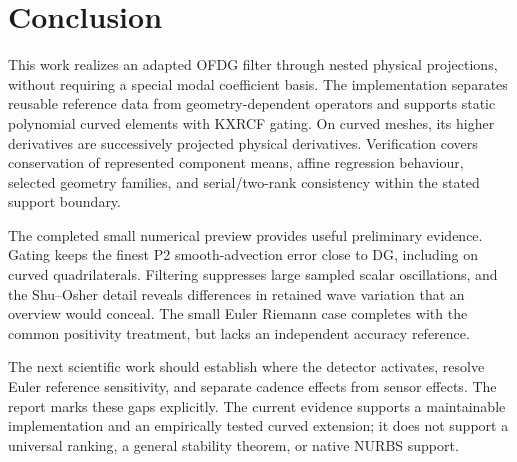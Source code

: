 \chapter{Conclusion}
\label{chap:conclusion}
This work realizes an adapted OFDG filter through nested physical projections,
without requiring a special modal coefficient basis. The implementation
separates reusable reference data from geometry-dependent operators and supports
static polynomial curved elements with KXRCF gating. On curved meshes, its
higher derivatives are successively projected physical derivatives. Verification
covers conservation of represented component means, affine regression behaviour,
selected geometry families, and serial/two-rank consistency within the stated
support boundary.

The completed small numerical preview provides useful preliminary evidence.
Gating keeps the finest P2 smooth-advection error close to DG, including on
curved quadrilaterals. Filtering suppresses large sampled scalar oscillations,
and the Shu--Osher detail reveals differences in retained wave variation that
an overview would conceal. The small Euler Riemann case completes with the
common positivity treatment, but lacks an independent accuracy reference.

The next scientific work should establish where the detector activates,
resolve Euler reference sensitivity, and separate cadence effects from sensor
effects. The report marks these gaps explicitly. The current evidence supports
a maintainable implementation and an empirically tested curved extension;
it does not support a universal ranking, a general stability theorem, or
native NURBS support.
